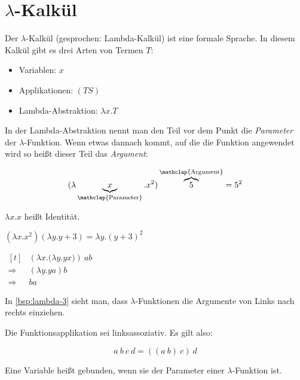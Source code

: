 \chapter{$\lambda$-Kalkül}
Der $\lambda$-Kalkül (gesprochen: Lambda-Kalkül) ist eine formale Sprache.
In diesem Kalkül gibt es drei Arten von Termen $T$:

\begin{itemize}
    \item Variablen: $x$
    \item Applikationen: $(T S)$
    \item Lambda-Abstraktion: $\lambda x. T$
\end{itemize}

In der Lambda-Abstraktion nennt man den Teil vor dem Punkt die \textit{Parameter}
der $\lambda$-Funktion. Wenn etwas dannach kommt, auf die die Funktion angewendet
wird so heißt dieser Teil das \textit{Argument}:

\[(\lambda \underbrace{x}_{\mathclap{\text{Parameter}}}. x^2) \overbrace{5}^{\mathclap{\text{Argument}}} = 5^2\]

\begin{beispiel}
    \begin{bspenum}
        \item $\lambda x. x$ heißt Identität.
        \item $(\lambda x. x^2)(\lambda y. y + 3) = \lambda y. (y+3)^2$
        \item \label{bsp:lambda-3} $\begin{aligned}[t]
                           &(\lambda x.\Big (\lambda y.yx \Big ))~ab\\
                \Rightarrow&(\lambda y.ya)b\\
                \Rightarrow&ba
               \end{aligned}$
    \end{bspenum}

    In \cref{bsp:lambda-3} sieht man, dass $\lambda$-Funktionen die Argumente
    von Links nach rechts einziehen.
\end{beispiel}

Die Funktionsapplikation sei linksassoziativ. Es gilt also:

\[a~b~c~d = ((a~b)~c)~d\]

\begin{definition}%
    Eine Variable heißt gebunden, wenn sie der Parameter einer $\lambda$-Funktion ist.
\end{definition}


